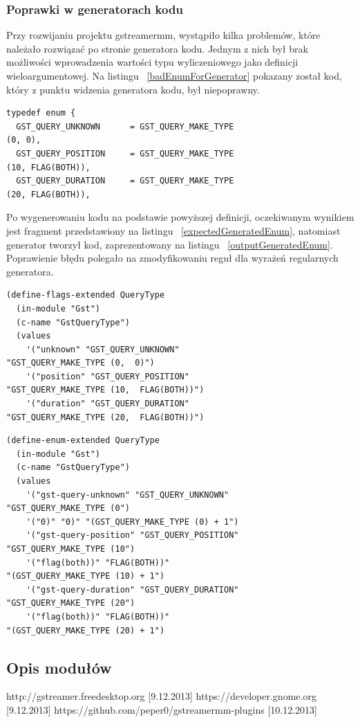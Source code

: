 \documentclass[12pt]{article}
\begin{document}
\subsubsection{Poprawki w generatorach kodu}
Przy rozwijaniu projektu gstreamermm, wystąpiło kilka problemów, które należało rozwiązać po stronie generatora kodu. Jednym z nich był brak możliwości wprowadzenia wartości typu wyliczeniowego jako definicji wieloargumentowej. Na listingu ~\ref{badEnumForGenerator} pokazany został kod, który z punktu widzenia generatora kodu, był niepoprawny.
    \begin{lstlisting}[caption=Przykładowy fragment niepoprawnego z punktu widzenia generatora kodu źródłowego, label=badEnumForGenerator]
typedef enum {
  GST_QUERY_UNKNOWN      = GST_QUERY_MAKE_TYPE
(0, 0),
  GST_QUERY_POSITION     = GST_QUERY_MAKE_TYPE 
(10, FLAG(BOTH)),
  GST_QUERY_DURATION     = GST_QUERY_MAKE_TYPE 
(20, FLAG(BOTH)),
    \end{lstlisting}

Po wygenerowaniu kodu na podstawie powyższej definicji, oczekiwanym wynikiem jest fragment przedstawiony na listingu ~\ref{expectedGeneratedEnum}, natomiast generator tworzył kod, zaprezentowany na listingu ~\ref{outputGeneratedEnum}. Poprawienie błędu polegało na zmodyfikowaniu reguł dla wyrażeń regularnych generatora.

    \begin{lstlisting}[caption=Oczekiwany wynik działania generatora kodu, label=badEnumForGenerator]
(define-flags-extended QueryType
  (in-module "Gst")
  (c-name "GstQueryType")
  (values
    '("unknown" "GST_QUERY_UNKNOWN" 
"GST_QUERY_MAKE_TYPE (0,  0)")
    '("position" "GST_QUERY_POSITION" 
"GST_QUERY_MAKE_TYPE (10,  FLAG(BOTH))")
    '("duration" "GST_QUERY_DURATION" 
"GST_QUERY_MAKE_TYPE (20,  FLAG(BOTH))")
    \end{lstlisting}

    \begin{lstlisting}[caption=Błędnie wygenerowany kod przez generator, label=badEnumForGenerator]
(define-enum-extended QueryType
  (in-module "Gst")
  (c-name "GstQueryType")
  (values
    '("gst-query-unknown" "GST_QUERY_UNKNOWN" 
"GST_QUERY_MAKE_TYPE (0")
    '("0)" "0)" "(GST_QUERY_MAKE_TYPE (0) + 1")
    '("gst-query-position" "GST_QUERY_POSITION" 
"GST_QUERY_MAKE_TYPE (10")
    '("flag(both))" "FLAG(BOTH))" 
"(GST_QUERY_MAKE_TYPE (10) + 1")
    '("gst-query-duration" "GST_QUERY_DURATION" 
"GST_QUERY_MAKE_TYPE (20")
    '("flag(both))" "FLAG(BOTH))" 
"(GST_QUERY_MAKE_TYPE (20) + 1")
    \end{lstlisting}

\subsection{Opis modułów}
\cleardoublepage
\begin{thebibliography}{9}

  http://gstreamer.freedesktop.org [9.12.2013]
  https://developer.gnome.org [9.12.2013]
  https://github.com/peper0/gstreamermm-plugins [10.12.2013]

\end{thebibliography}
\end{document}
